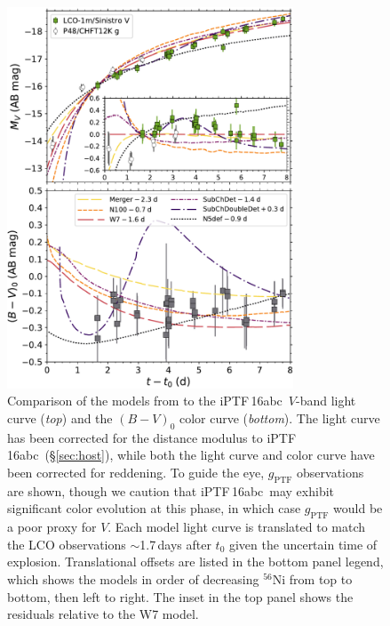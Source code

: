 \documentclass[twocolumn]{aastex61}
\newcommand{\abc}{iPTF\,16abc}
\begin{document}
\begin{figure}[]
  \centering
  \includegraphics[width=3.35in]{compare_Noebauer.pdf}
  \caption{
  Comparison of the models from \citet{2017MNRAS.472.2787N} to the \abc\
  $V$-band light curve (\textit{top}) and the $(B-V)_0$ color curve
  (\textit{bottom}). The light curve has been corrected for the distance
  modulus to \abc\ (\S\ref{sec:host}), while both the light curve and color
  curve have been corrected for reddening. To guide the eye,
  $g_\mathrm{PTF}$ observations are shown, though we caution that \abc\ may
  exhibit significant color evolution at this phase, in which case
  $g_\mathrm{PTF}$ would be a poor proxy for $V$. Each model light curve is
  translated to match the LCO observations $\sim$1.7\,days after $t_0$ given
  the uncertain time of explosion. Translational offsets are listed in the
  bottom panel legend, which shows the models in order of decreasing
  $^{56}$Ni from top to bottom, then left to right. The inset in the top
  panel shows the residuals relative to the W7 model.}
  \label{fig:noebauer} 
\end{figure}
\end{document}
